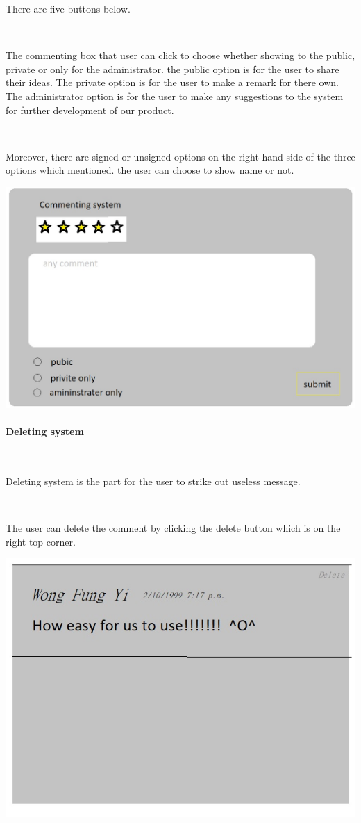 There are five buttons below.\par~

The commenting box that user can click to choose whether showing to the public, private or only for the administrator. the public option is for the user to share their ideas. The private option is for the user to make a remark for there own. The administrator option is for the user to make any suggestions to the system for further development of our product.\par~

Moreover, there are signed or unsigned options on the right hand side of the three options which mentioned. the user can choose to show name or not.

\includegraphics[scale=0.5]{Doc/Graphics/sdfg}

\paragraph{Deleting system}~

Deleting system is the part for the user to strike out useless message.\par~

The user can delete the comment by clicking the delete button which is on the right top corner.

\includegraphics[scale=0.5]{Doc/Graphics/asdf}
